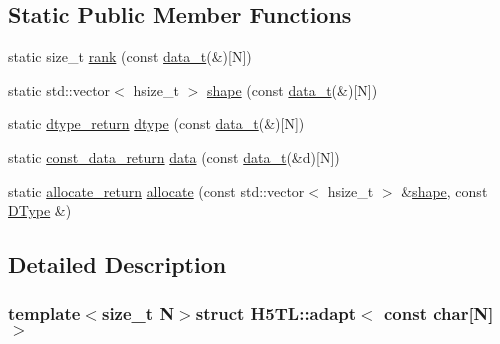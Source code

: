 \subsection*{Static Public Member Functions}
\begin{DoxyCompactItemize}
\item 
static size\-\_\-t \hyperlink{struct_h5_t_l_1_1adapt_3_01const_01char[_n]_4_adff8406e72c5252087436e29a386ece3}{rank} (const \hyperlink{struct_h5_t_l_1_1adapt_3_01const_01char[_n]_4_a74d18aaf246764491c0bb12be80e607b}{data\-\_\-t}(\&)\mbox{[}N\mbox{]})
\item 
static std\-::vector$<$ hsize\-\_\-t $>$ \hyperlink{struct_h5_t_l_1_1adapt_3_01const_01char[_n]_4_a52c5afa30681e88799e9986ed49876e1}{shape} (const \hyperlink{struct_h5_t_l_1_1adapt_3_01const_01char[_n]_4_a74d18aaf246764491c0bb12be80e607b}{data\-\_\-t}(\&)\mbox{[}N\mbox{]})
\item 
static \hyperlink{struct_h5_t_l_1_1adapt_3_01const_01char[_n]_4_aa516830e84fe65292c6d1e2c94f73b93}{dtype\-\_\-return} \hyperlink{struct_h5_t_l_1_1adapt_3_01const_01char[_n]_4_a8c9f0e3d909cb43e785907deed9e6811}{dtype} (const \hyperlink{struct_h5_t_l_1_1adapt_3_01const_01char[_n]_4_a74d18aaf246764491c0bb12be80e607b}{data\-\_\-t}(\&)\mbox{[}N\mbox{]})
\item 
static \hyperlink{struct_h5_t_l_1_1adapt_3_01const_01char[_n]_4_a5053e82858247b9c7497e610f23391a5}{const\-\_\-data\-\_\-return} \hyperlink{struct_h5_t_l_1_1adapt_3_01const_01char[_n]_4_aba4642ccd8af411573323b1646677a24}{data} (const \hyperlink{struct_h5_t_l_1_1adapt_3_01const_01char[_n]_4_a74d18aaf246764491c0bb12be80e607b}{data\-\_\-t}(\&d)\mbox{[}N\mbox{]})
\item 
static \hyperlink{struct_h5_t_l_1_1adapt_3_01const_01char[_n]_4_ac3d3bf85390126994e3876cda484bbe2}{allocate\-\_\-return} \hyperlink{struct_h5_t_l_1_1adapt_3_01const_01char[_n]_4_abe3e829d4c654c6b6d1cb642539c9f25}{allocate} (const std\-::vector$<$ hsize\-\_\-t $>$ \&\hyperlink{struct_h5_t_l_1_1adapt_3_01const_01char[_n]_4_a52c5afa30681e88799e9986ed49876e1}{shape}, const \hyperlink{class_h5_t_l_1_1_d_type}{D\-Type} \&)
\end{DoxyCompactItemize}


\subsection{Detailed Description}
\subsubsection*{template$<$size\-\_\-t N$>$struct H5\-T\-L\-::adapt$<$ const char\mbox{[}\-N\mbox{]}$>$}



